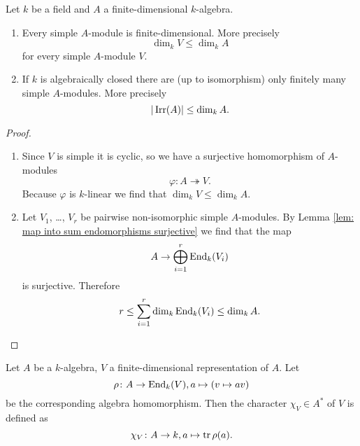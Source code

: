 \begin{prop}\label{prop: simple modules over finite-dimensional algebras}
 Let $k$ be a field and $A$ a finite-dimensional $k$-algebra.
 \begin{enumerate}[label=\emph{\alph*)},leftmargin=*]
  \item
   Every simple $A$-module is finite-dimensional. More precisely
   \[
    \dim_k V \leq \dim_k A
   \]
   for every simple $A$-module $V$.
  \item
   If $k$ is algebraically closed there are (up to isomorphism) only finitely many simple $A$-modules. More precisely
   \[
    |\operatorname{Irr}(A)| \leq \dim_k A.
   \]
 \end{enumerate}
\end{prop}
\begin{proof}
 \begin{enumerate}[label=\emph{\alph*)},leftmargin=*]
  \item
   Since $V$ is simple it is cyclic, so we have a surjective homomorphism of $A$-modules
   \[
    \varphi \colon A \twoheadrightarrow V.
   \]
   Because $\varphi$ is $k$-linear we find that $\dim_k V \leq \dim_k A$.
  \item
   Let $V_1$, \dots, $V_r$ be pairwise non-isomorphic simple $A$-modules. By Lemma \ref{lem: map into sum endomorphisms surjective} we find that the map
   \[
    A \to \bigoplus_{i=1}^r \operatorname{End}_k(V_i)
   \]
   is surjective. Therefore
   \[
    r \leq \sum_{i=1}^r \dim_k \operatorname{End}_k(V_i) \leq \dim_k A.
    \qedhere
   \]
 \end{enumerate}
\end{proof}


\begin{defi}
 Let $A$ be a $k$-algebra, $V$ a finite-dimensional representation of $A$. Let
 \[
  \rho \colon A \to \operatorname{End}_k(V), a \mapsto (v \mapsto av)
 \]
 be the corresponding algebra homomorphism. Then the character $\chi_V \in A^*$ of $V$ is defined as
 \[
  \chi_V \colon A \to k, a \mapsto \operatorname{tr} \rho(a).
 \]
\end{defi}


